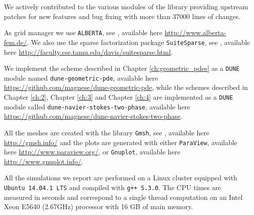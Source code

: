 We actively contributed to the various modules of the library providing
upstream patches for new features and bug fixing with more than 37000 lines of
changes.

As grid manager we use \verb|ALBERTA|, see \cite{Alberta}, available here
\url{http://www.alberta-fem.de/}. We also use the sparse factorization
package \verb|SuiteSparse|, see \cite{Davis04}, available here
\url{http://faculty.cse.tamu.edu/davis/suitesparse.html}.

We implement the scheme described in Chapter \ref{ch:geometric_pdes} as a
\verb|DUNE| module named \verb|dune-geometric-pde|, available here
\url{https://github.com/magnese/dune-geometric-pde}, while the schemes described
in Chapter \ref{ch:2}, Chapter \ref{ch:3} and Chapter \ref{ch:4} are implemented
as a \verb|DUNE| module called \verb|dune-navier-stokes-two-phase|, available
here \url{https://github.com/magnese/dune-navier-stokes-two-phase}.

All the meshes are created with the library \verb|Gmsh|, see
\cite{GeuzaineR09}, available here \url{http://gmsh.info/} and the plots are
generated with either \verb|ParaView|, available here
\url{http://www.paraview.org/}, or \verb|Gnuplot|, available here
\url{http://www.gnuplot.info/}.

All the simulations we report are performed on a Linux cluster equipped with
\verb|Ubuntu 14.04.1 LTS| and compiled with \verb|g++ 5.3.0|. The CPU times
are measured in seconds and correspond to a single thread computation on an
Intel Xeon E5640 (2.67GHz) processor with 16 GB of main memory.
